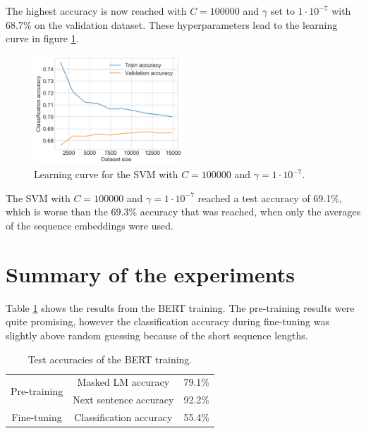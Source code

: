 The highest accuracy is now reached with $C=100000$ and $\gamma$ set to $1\cdot10^{-7}$ with 68.7\% on the validation dataset.
These hyperparameters lead to the learning curve in figure \ref{figure:svm_learning_std}.
\begin{figure}[h]
    \centering
    \includegraphics[width=0.5\textwidth]{figures/charts/training_with_std/svm_learning_curve.png}
    \caption{Learning curve for the \ac{SVM} with $C=100000$ and $\gamma=1\cdot10^{-7}$.}
    \label{figure:svm_learning_std}
\end{figure}
The \ac{SVM} with $C=100000$ and $\gamma=1\cdot10^{-7}$ reached a test accuracy of 69.1\%, which is worse than the 69.3\% accuracy that was reached, when only the averages of the sequence embeddings were used.
\clearpage

\section{Summary of the experiments}
Table \ref{table:test_results_bert} shows the results from the \ac{BERT} training.
The pre-training results were quite promising, however the classification accuracy during fine-tuning was slightly above random guessing because of the short sequence lengths.
\begin{table}[h]
    \centering
    \begin{tabular}{ c | c | c }
        \multirow{2}{*}{Pre-training} & Masked LM accuracy & 79.1\% \\
        & Next sentence accuracy & 92.2\% \\ \hline
        Fine-tuning & Classification accuracy & 55.4\%
    \end{tabular}
    \caption{Test accuracies of the \ac{BERT} training.}
    \label{table:test_results_bert}
\end{table}

